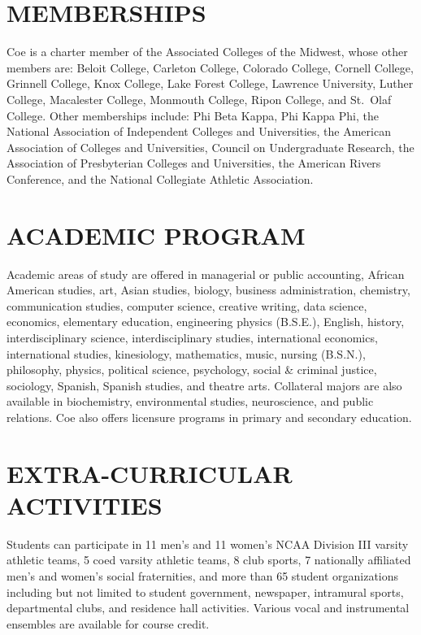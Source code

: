 \documentclass[
  letterpaper,
]{scrbook}
\begin{document}
\section{MEMBERSHIPS}\label{memberships}

Coe is a charter member of the Associated Colleges of the Midwest, whose
other members are: Beloit College, Carleton College, Colorado College,
Cornell College, Grinnell College, Knox College, Lake Forest College,
Lawrence University, Luther College, Macalester College, Monmouth
College, Ripon College, and St.~Olaf College. Other memberships include:
Phi Beta Kappa, Phi Kappa Phi, the National Association of Independent
Colleges and Universities, the American Association of Colleges and
Universities, Council on Undergraduate Research, the Association of
Presbyterian Colleges and Universities, the American Rivers Conference,
and the National Collegiate Athletic Association.

\section{ACADEMIC PROGRAM}\label{academic-program}

Academic areas of study are offered in managerial or public accounting,
African American studies, art, Asian studies, biology, business
administration, chemistry, communication studies, computer science,
creative writing, data science, economics, elementary education,
engineering physics (B.S.E.), English, history, interdisciplinary
science, interdisciplinary studies, international economics,
international studies, kinesiology, mathematics, music, nursing
(B.S.N.), philosophy, physics, political science, psychology, social \&
criminal justice, sociology, Spanish, Spanish studies, and theatre arts.
Collateral majors are also available in biochemistry, environmental
studies, neuroscience, and public relations. Coe also offers licensure
programs in primary and secondary education.

\section{EXTRA-CURRICULAR ACTIVITIES}\label{extra-curricular-activities}

Students can participate in 11 men's and 11 women's NCAA Division III
varsity athletic teams, 5 coed varsity athletic teams, 8 club sports, 7
nationally affiliated men's and women's social fraternities, and more
than 65 student organizations including but not limited to student
government, newspaper, intramural sports, departmental clubs, and
residence hall activities. Various vocal and instrumental ensembles are
available for course credit.
\end{document}

